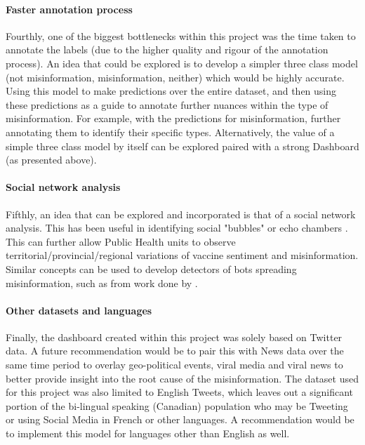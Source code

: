 \documentclass[12pt]{article}
\begin{document}
	
\paragraph{Faster annotation process} Fourthly, one of the biggest bottlenecks within this project was the time taken to annotate the labels (due to the higher quality and rigour of the annotation process). An idea that could be explored is to develop a simpler three class model (not misinformation, misinformation, neither) which would be highly accurate. Using this model to make predictions over the entire dataset, and then using these predictions as a guide to annotate further nuances within the type of misinformation. For example, with the predictions for misinformation, further annotating them to identify their specific types. Alternatively, the value of a simple three class model by itself can be explored paired with a strong Dashboard (as presented above).

\paragraph{Social network analysis} Fifthly, an idea that can be explored and incorporated is that of a social network analysis. This has been useful in identifying social "bubbles" or echo chambers \cite{cnet-2016, garimella-2017}. This can further allow Public Health units to observe territorial/provincial/regional variations of vaccine sentiment and misinformation. Similar concepts can be used to develop detectors of bots spreading misinformation, such as from work done by \cite{davis-2016}. 

\paragraph{Other datasets and languages} Finally, the dashboard created within this project was solely based on Twitter data. A future recommendation would be to pair this with News data over the same time period to overlay geo-political events, viral media and viral news to better provide insight into the root cause of the misinformation. The dataset used for this project was also limited to English Tweets, which leaves out a significant portion of the bi-lingual speaking (Canadian) population who may be Tweeting or using Social Media in French or other languages. A recommendation would be to implement this model for languages other than English as well.  

\newpage
\end{document}
